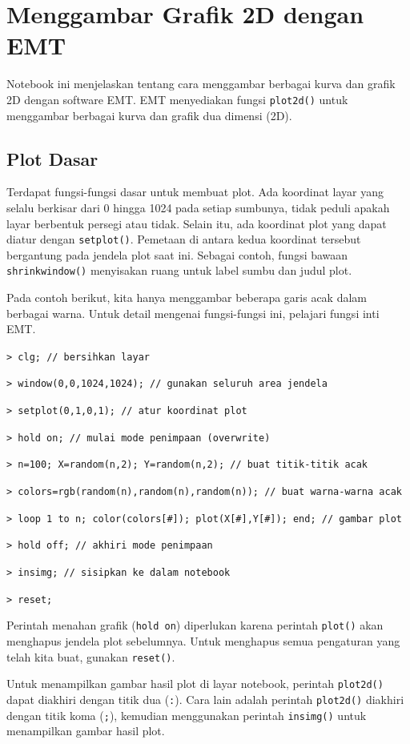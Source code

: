 \documentclass[11pt, a4paper]{article}
\newcommand{\emtcmd}[1]{\noindent\texttt{\textcolor{emtcommand}{>}\ #1}\par\smallskip}
\begin{document}
\section*{Menggambar Grafik 2D dengan EMT}

Notebook ini menjelaskan tentang cara menggambar berbagai kurva dan grafik 2D dengan software EMT. EMT menyediakan fungsi \texttt{plot2d()} untuk menggambar berbagai kurva dan grafik dua dimensi (2D).

\subsection*{Plot Dasar}

Terdapat fungsi-fungsi dasar untuk membuat plot. Ada koordinat layar yang selalu berkisar dari 0 hingga 1024 pada setiap sumbunya, tidak peduli apakah layar berbentuk persegi atau tidak. Selain itu, ada koordinat plot yang dapat diatur dengan \texttt{setplot()}. Pemetaan di antara kedua koordinat tersebut bergantung pada jendela plot saat ini. Sebagai contoh, fungsi bawaan \texttt{shrinkwindow()} menyisakan ruang untuk label sumbu dan judul plot.

Pada contoh berikut, kita hanya menggambar beberapa garis acak dalam berbagai warna. Untuk detail mengenai fungsi-fungsi ini, pelajari fungsi inti EMT.

\emtcmd{clg; \textcolor{emtcomment}{// bersihkan layar}}
\emtcmd{window(0,0,1024,1024); \textcolor{emtcomment}{// gunakan seluruh area jendela}}
\emtcmd{setplot(0,1,0,1); \textcolor{emtcomment}{// atur koordinat plot}}
\emtcmd{hold on; \textcolor{emtcomment}{// mulai mode penimpaan (overwrite)}}
\emtcmd{n=100; X=random(n,2); Y=random(n,2); \textcolor{emtcomment}{// buat titik-titik acak}}
\emtcmd{colors=rgb(random(n),random(n),random(n)); \textcolor{emtcomment}{// buat warna-warna acak}}
\emtcmd{loop 1 to n; color(colors[\#]); plot(X[\#],Y[\#]); end; \textcolor{emtcomment}{// gambar plot}}
\emtcmd{hold off; \textcolor{emtcomment}{// akhiri mode penimpaan}}
\emtcmd{insimg; \textcolor{emtcomment}{// sisipkan ke dalam notebook}}
\emtcmd{reset;}

Perintah menahan grafik (\texttt{hold on}) diperlukan karena perintah \texttt{plot()} akan menghapus jendela plot sebelumnya. Untuk menghapus semua pengaturan yang telah kita buat, gunakan \texttt{reset()}.

Untuk menampilkan gambar hasil plot di layar notebook, perintah \texttt{plot2d()} dapat diakhiri dengan titik dua (\texttt{:}). Cara lain adalah perintah \texttt{plot2d()} diakhiri dengan titik koma (\texttt{;}), kemudian menggunakan perintah \texttt{insimg()} untuk menampilkan gambar hasil plot.
\end{document}
